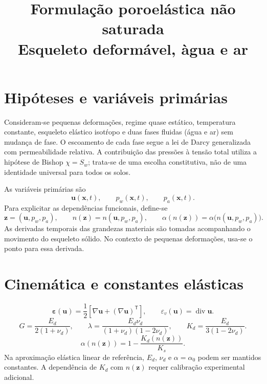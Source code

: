 \documentclass[11pt,a4paper]{article}
\title{Formula\c{c}\~ao poroel\'astica n\~ao saturada\\
\large Esqueleto deform\'avel, \`agua e ar}
\author{}
\date{}
\newcommand{\Div}{\operatorname{div}}
\begin{document}
\maketitle
\vspace{-2em}

\section{Hip\'oteses e vari\'aveis prim\'arias}

Consideram-se pequenas deforma\c{c}\~oes, regime quase est\'atico,
temperatura constante, esqueleto el\'astico isot\'ropo e duas fases fluidas
(\'agua e ar) sem mudan\c{c}a de fase. O escoamento de cada fase segue
a lei de Darcy generalizada com permeabilidade relativa. A contribui\c{c}\~ao
das press\~oes \`a tens\~ao total utiliza a hip\'otese de Bishop
$\chi=S_w$; trata-se de uma escolha constitutiva, n\~ao de uma identidade
universal para todos os solos.

As vari\'aveis prim\'arias s\~ao
\begin{equation*}
\boxed{\mathbf u(\mathbf x,t),\qquad p_w(\mathbf x,t),\qquad p_a(\mathbf x,t).}
\end{equation*}
Para explicitar as depend\^encias funcionais, define-se
\begin{equation*}
\mathbf z=(\mathbf u,p_w,p_a),\qquad
n(\mathbf z)=n(\mathbf u,p_w,p_a),\qquad
\alpha(n(\mathbf z))=\alpha\bigl(n(\mathbf u,p_w,p_a)\bigr).
\end{equation*}
As derivadas temporais das grandezas materiais s\~ao tomadas acompanhando
o movimento do esqueleto s\'olido. No contexto de pequenas deforma\c{c}\~oes,
usa-se o ponto para essa derivada.

\section{Cinem\'atica e constantes el\'asticas}

\begin{equation*}
\boxed{\boldsymbol\varepsilon(\mathbf u)=
\frac12\left[\nabla\mathbf u+(\nabla\mathbf u)^{\mathsf T}\right],
\qquad \varepsilon_v(\mathbf u)=\Div\mathbf u.}
\end{equation*}
\begin{equation*}
G=\frac{E_d}{2(1+\nu_d)},\qquad
\lambda=\frac{E_d\nu_d}{(1+\nu_d)(1-2\nu_d)},\qquad
K_d=\frac{E_d}{3(1-2\nu_d)}.
\end{equation*}
\begin{equation*}
\boxed{\alpha(n(\mathbf z))=1-\frac{K_d(n(\mathbf z))}{K_s}.}
\end{equation*}
Na aproxima\c{c}\~ao el\'astica linear de refer\^encia, $E_d$, $\nu_d$
e $\alpha=\alpha_0$ podem ser mantidos constantes. A depend\^encia de
$K_d$ com $n(\mathbf z)$ requer calibra\c{c}\~ao experimental adicional.
\end{document}
